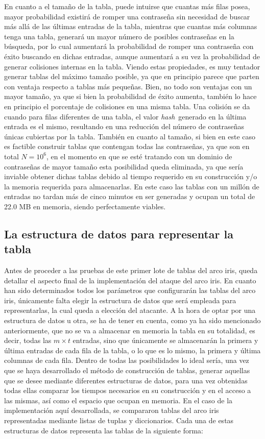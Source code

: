 \documentclass[12pt,spanish,listoffigures,listoftables,listofalgorithms]{tfgetsinf}
\newcommand{\hash}{\textit{hash}}
\begin{document}
En cuanto a el tamaño de la tabla, puede intuirse que cuantas más filas posea, mayor probabilidad existirá de romper una contraseña sin necesidad de buscar más allá de las últimas entradas de la tabla, mientras que cuantas más columnas tenga una tabla, generará un mayor número de posibles contraseñas en la búsqueda, por lo cual aumentará la probabilidad de romper una contraseña con éxito buscando en dichas entradas, aunque aumentará a su vez la probabilidad de generar colisiones internas en la tabla. Viendo estas propiedades, es muy tentador generar tablas del máximo tamaño posible, ya que en principio parece que parten con ventaja respecto a tablas más pequeñas. Bien, no todo son ventajas con un mayor tamaño, ya que si bien la probabilidad de éxito aumenta, también lo hace en principio el porcentaje de colisiones en una misma tabla. Una colisión se da cuando para filas diferentes de una tabla, el valor \hash~generado en la última entrada es el mismo, resultando en una reducción del número de contraseñas únicas cubiertas por la tabla. También en cuanto al tamaño, si bien en este caso es factible construir tablas que contengan todas las contraseñas, ya que son en total $N = 10^6$, en el momento en que se esté tratando con un dominio de contraseñas de mayor tamaño esta posibilidad queda eliminada, ya que sería inviable obtener dichas tablas debido al tiempo requerido en su construcción y/o la memoria requerida para almacenarlas. En este caso las tablas con un millón de entradas no tardan más de cinco minutos en ser generadas y ocupan un total de 22.0 MB en memoria, siendo perfectamente viables.

\subsection{La estructura de datos para representar la tabla}

Antes de proceder a las pruebas de este primer lote de tablas del arco iris, queda detallar el aspecto final de la implementación del ataque del arco iris. En cuanto han sido determinados todos los parámetros que configurarán las tablas del arco iris, únicamente falta elegir la estructura de datos que será empleada para representarlas, la cual queda a elección del atacante. A la hora de optar por una estructura de datos u otra, se ha de tener en cuenta, como ya ha sido mencionado anteriormente, que no se va a almacenar en memoria la tabla en su totalidad, es decir, todas las $m \times t$ entradas, sino que únicamente se almacenarán la primera y última entradas de cada fila de la tabla, o lo que es lo mismo, la primera y última columnas de cada fila. Dentro de todas las posibilidades lo ideal sería, una vez que se haya desarrollado el método de construcción de tablas, generar aquellas que se desee mediante diferentes estructuras de datos, para una vez obtenidas todas ellas comparar los tiempos necesarios en su construcción y en el acceso a las mismas, así como el espacio que ocupan en memoria. En el caso de la implementación aquí desarrollada, se compararon tablas del arco iris representadas mediante listas de tuplas y diccionarios. Cada una de estas estructuras de datos representa las tablas de la siguiente forma:
\end{document}
